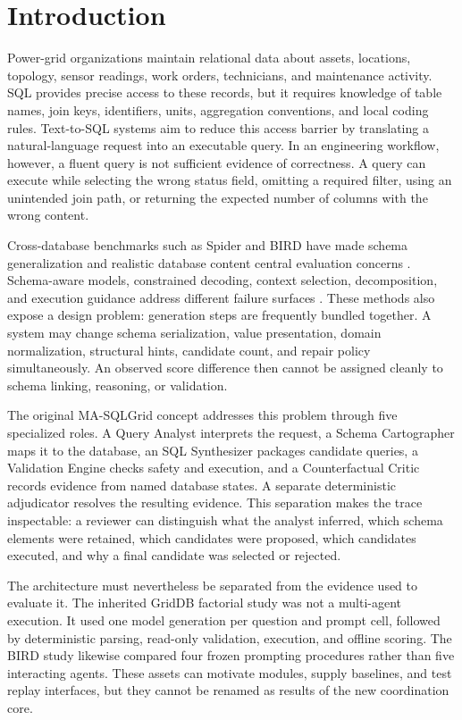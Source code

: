 \documentclass[applsci,article,submit,moreauthors]{Definitions/mdpi}
\newcommand{\masql}{MA-SQLGrid}
\begin{document}
\section{Introduction}

Power-grid organizations maintain relational data about assets, locations, topology, sensor readings, work orders, technicians, and maintenance activity. SQL provides precise access to these records, but it requires knowledge of table names, join keys, identifiers, units, aggregation conventions, and local coding rules. Text-to-SQL systems aim to reduce this access barrier by translating a natural-language request into an executable query. In an engineering workflow, however, a fluent query is not sufficient evidence of correctness. A query can execute while selecting the wrong status field, omitting a required filter, using an unintended join path, or returning the expected number of columns with the wrong content.

Cross-database benchmarks such as Spider and BIRD have made schema generalization and realistic database content central evaluation concerns \cite{yu2018spider,li2023bird}. Schema-aware models, constrained decoding, context selection, decomposition, and execution guidance address different failure surfaces \cite{wang2020ratsql,scholak2021picard,nan2023enhancing,pourreza2023dinsql,talaei2024chess}. These methods also expose a design problem: generation steps are frequently bundled together. A system may change schema serialization, value presentation, domain normalization, structural hints, candidate count, and repair policy simultaneously. An observed score difference then cannot be assigned cleanly to schema linking, reasoning, or validation.

The original \masql{} concept addresses this problem through five specialized roles. A Query Analyst interprets the request, a Schema Cartographer maps it to the database, an SQL Synthesizer packages candidate queries, a Validation Engine checks safety and execution, and a Counterfactual Critic records evidence from named database states. A separate deterministic adjudicator resolves the resulting evidence. This separation makes the trace inspectable: a reviewer can distinguish what the analyst inferred, which schema elements were retained, which candidates were proposed, which candidates executed, and why a final candidate was selected or rejected.

The architecture must nevertheless be separated from the evidence used to evaluate it. The inherited GridDB factorial study was not a multi-agent execution. It used one model generation per question and prompt cell, followed by deterministic parsing, read-only validation, execution, and offline scoring. The BIRD study likewise compared four frozen prompting procedures rather than five interacting agents. These assets can motivate modules, supply baselines, and test replay interfaces, but they cannot be renamed as results of the new coordination core.
\end{document}
